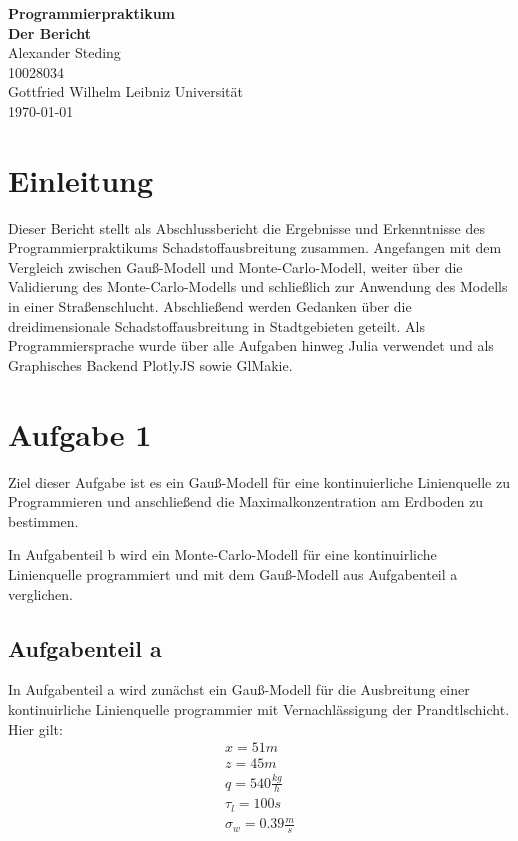 \documentclass[ngerman]{scrartcl}
\newcommand{\authA}{Alexander Steding}
\begin{document}



\begin{titlepage}
\begin{center}
\vspace{3cm}
{\fontsize{40}{49} \selectfont \textbf{Programmierpraktikum}}\\[2cm]
{\fontsize{40}{49} \selectfont \textbf{Der Bericht}}\\[2cm]
\Large{\authA }\\
\Large{10028034 }\\
\large{Gottfried Wilhelm Leibniz Universität\\{\today}}
\end{center}
\end{titlepage}

\newpage
\tableofcontents
\newpage
\section{Einleitung }
Dieser Bericht stellt als Abschlussbericht die Ergebnisse und Erkenntnisse des Programmierpraktikums Schadstoffausbreitung zusammen. Angefangen mit dem Vergleich zwischen Gauß-Modell und Monte-Carlo-Modell, weiter über die Validierung des Monte-Carlo-Modells und schließlich zur Anwendung des Modells in einer Straßenschlucht. Abschließend werden Gedanken über die dreidimensionale Schadstoffausbreitung  in Stadtgebieten geteilt. Als Programmiersprache wurde über alle Aufgaben hinweg Julia verwendet und als Graphisches Backend PlotlyJS sowie GlMakie.
\section{Aufgabe  1}
Ziel dieser Aufgabe ist es ein Gauß-Modell für eine kontinuierliche Linienquelle zu Programmieren und anschließend die Maximalkonzentration am Erdboden zu bestimmen.

In Aufgabenteil b wird ein Monte-Carlo-Modell für eine kontinuirliche Linienquelle programmiert und mit dem Gauß-Modell aus Aufgabenteil a verglichen.
\subsection{Aufgabenteil a}
In Aufgabenteil a wird zunächst ein Gauß-Modell für die Ausbreitung einer kontinuirliche Linienquelle programmier mit Vernachlässigung der Prandtlschicht. 
Hier gilt:
\begin{align}
x= 51 \si{m} \\
z= 45 \si{m} \\
q= 540 \frac{\si{kg}}{\si{h}}\\
\tau_{l} =100 \si{s}\\
\sigma_{w}=0.39 \frac{\si{m}}{\si{s}}\\
\end{align}
\end{document}
